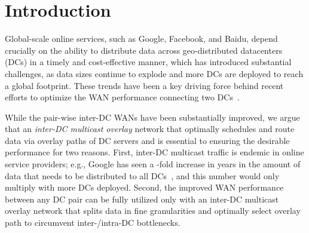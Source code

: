 \section{Introduction}

Global-scale online services, such as Google, Facebook, and Baidu, 
depend crucially on the ability to distribute data across 
geo-distributed datacenters (DCs) in a timely and cost-effective 
manner, which has introduced substantial challenges, as data sizes 
continue to explode and more DCs are deployed to reach a global 
footprint. 
These trends have been a key driving force behind recent efforts 
to optimize the WAN performance connecting two 
DCs~\cite{b4,bwe,swan,??,??,??}. 

While the pair-wise inter-DC WANs have been substantially improved, 
we argue that an {\em inter-DC multicast 
overlay} network that optimally schedules and route data via 
overlay paths of DC servers and is essential to ensuring the 
desirable performance for two reasons.
First, inter-DC multicast traffic is endemic in online service 
providers; e.g.,
Google has seen a \fillme-fold increase in \fillme years
in the amount of data that needs to be distributed to all 
DCs~\cite{??}, and this number would only multiply with more 
DCs deployed.
Second, the improved WAN performance between any DC pair can be
fully utilized only with an inter-DC multicast overlay network that 
splits data in fine granularities and optimally select 
overlay path to circumvent inter-/intra-DC bottlenecks.



